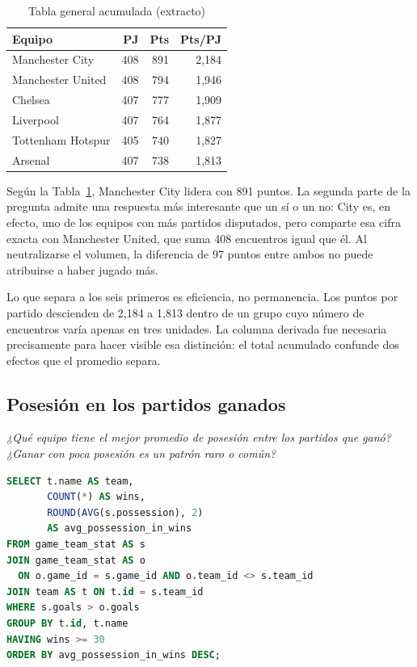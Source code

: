 \documentclass[conference]{IEEEtran}
\begin{document}
\begin{table}[htbp]
\caption{Tabla general acumulada (extracto)}
\label{tab:general}
\centering
\begin{tabular}{lrrr}
\toprule
\textbf{Equipo} & \textbf{PJ} & \textbf{Pts} & \textbf{Pts/PJ} \\
\midrule
Manchester City    & 408 & 891 & 2,184 \\
Manchester United  & 408 & 794 & 1,946 \\
Chelsea            & 407 & 777 & 1,909 \\
Liverpool          & 407 & 764 & 1,877 \\
Tottenham Hotspur  & 405 & 740 & 1,827 \\
Arsenal            & 407 & 738 & 1,813 \\
\bottomrule
\end{tabular}
\end{table}

Según la Tabla~\ref{tab:general}, Manchester City lidera con 891 puntos. La
segunda parte de la pregunta admite una respuesta más interesante que un sí o
un no: City es, en efecto, uno de los equipos con más partidos disputados, pero
comparte esa cifra exacta con Manchester United, que suma 408 encuentros igual
que él. Al neutralizarse el volumen, la diferencia de 97 puntos entre ambos no
puede atribuirse a haber jugado más.

Lo que separa a los seis primeros es eficiencia, no permanencia. Los puntos por
partido descienden de 2,184 a 1,813 dentro de un grupo cuyo número de
encuentros varía apenas en tres unidades. La columna derivada fue necesaria
precisamente para hacer visible esa distinción: el total acumulado confunde dos
efectos que el promedio separa.

\subsection{Posesión en los partidos ganados}

\emph{¿Qué equipo tiene el mejor promedio de posesión entre los partidos que
ganó? ¿Ganar con poca posesión es un patrón raro o común?}

\begin{lstlisting}[language=SQL]
SELECT t.name AS team,
       COUNT(*) AS wins,
       ROUND(AVG(s.possession), 2)
       AS avg_possession_in_wins
FROM game_team_stat AS s
JOIN game_team_stat AS o
  ON o.game_id = s.game_id AND o.team_id <> s.team_id
JOIN team AS t ON t.id = s.team_id
WHERE s.goals > o.goals
GROUP BY t.id, t.name
HAVING wins >= 30
ORDER BY avg_possession_in_wins DESC;
\end{lstlisting}
\end{document}
